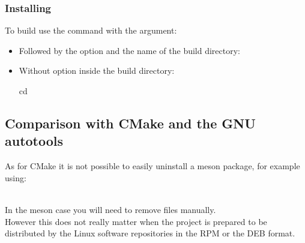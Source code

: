 \subsubsection*{Installing}

To build use the  command with the  argument: 
\begin{itemize}
\item Followed by the option  and the name of the build directory:
\begin{scripti}
     
\end{scripti}
\item Without option inside the build directory:
\begin{scripti}
 cd 
   
\end{scripti}
\end{itemize}


\subsection{Comparison with CMake and the GNU autotools}

As for CMake it is not possible to easily uninstall a meson package, for example using: 
\begin{script}
   
\end{script}
\\[-0.5cm]
In the meson case you will need to remove files manually. \\[0.25cm]
However this does not really matter when the project is prepared to be distributed by the Linux software repositories in the RPM or the DEB format. 

